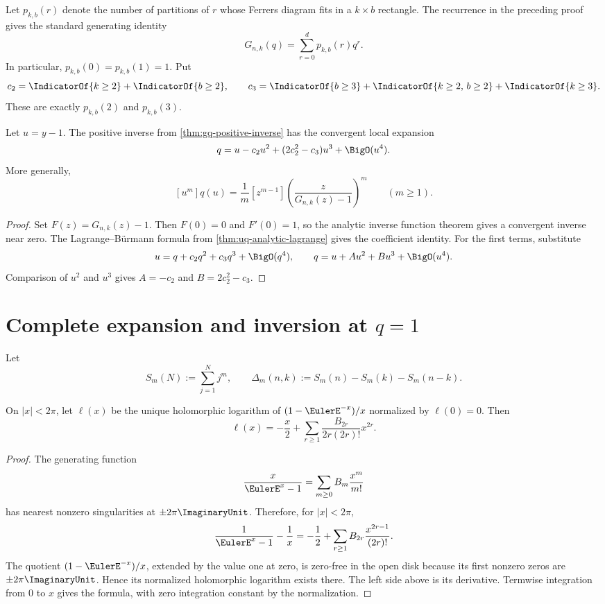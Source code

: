 Let \(p_{k,b}(r)\) denote the number of partitions of \(r\) whose Ferrers
diagram fits in a \(k\times b\) rectangle.  The recurrence in the preceding
proof gives the standard generating identity
\[
  G_{n,k}(q)=\sum_{r=0}^{d}p_{k,b}(r)q^r.
\]
In particular, \(p_{k,b}(0)=p_{k,b}(1)=1\).  Put
\[
  c_2=\IndicatorOf{k\ge2}+\IndicatorOf{b\ge2},
  \qquad
  c_3=\IndicatorOf{b\ge3}
      +\IndicatorOf{k\ge2,\,b\ge2}
      +\IndicatorOf{k\ge3}.
\]
These are exactly \(p_{k,b}(2)\) and \(p_{k,b}(3)\).

\begin{theorem}
\label{thm:gq-zero-inverse}
Let \(u=y-1\).  The positive inverse from
\cref{thm:gq-positive-inverse} has the convergent local expansion
\[
  q=u-c_2u^2+(2c_2^2-c_3)u^3+\BigO(u^4).
\]
More generally,
\[
  [u^m]q(u)
  =\frac1m[z^{m-1}]
    \left(\frac{z}{G_{n,k}(z)-1}\right)^m
  \qquad(m\ge1).
\]
\end{theorem}

\begin{proof}
Set \(F(z)=G_{n,k}(z)-1\).  Then \(F(0)=0\) and \(F'(0)=1\), so the
analytic inverse function theorem gives a convergent inverse near zero.
The Lagrange--Bürmann formula from
\cref{thm:uq-analytic-lagrange} gives the coefficient identity.  For the
first terms, substitute
\[
  u=q+c_2q^2+c_3q^3+\BigO(q^4),
  \qquad
  q=u+A u^2+B u^3+\BigO(u^4).
\]
Comparison of \(u^2\) and \(u^3\) gives \(A=-c_2\) and
\(B=2c_2^2-c_3\).
\end{proof}

\section{\texorpdfstring{Complete expansion and inversion at \(q=1\)}{Complete expansion and inversion at q=1}}
\label{sec:gaussian-one}

Let
\[
  S_m(N):=\sum_{j=1}^{N}j^m,
  \qquad
  \Delta_m(n,k):=S_m(n)-S_m(k)-S_m(n-k).
\]

\begin{lemma}
\label{lem:gq-bernoulli-factor}
On \(|x|<2\pi\), let \(\ell(x)\) be the unique holomorphic logarithm of
\((1-\EulerE^{-x})/x\) normalized by \(\ell(0)=0\).  Then
\[
  \ell(x)
  =-\frac{x}{2}
   +\sum_{r\ge1}\frac{B_{2r}}{2r(2r)!}x^{2r}.
\]
\end{lemma}

\begin{proof}
The generating function
\[
  \frac{x}{\EulerE^x-1}
  =\sum_{m\ge0}B_m\frac{x^m}{m!}
\]
has nearest nonzero singularities at \(\pm2\pi\ImaginaryUnit\).  Therefore, for
\(|x|<2\pi\),
\[
  \frac1{\EulerE^x-1}-\frac1x
  =-\frac12+\sum_{r\ge1}B_{2r}\frac{x^{2r-1}}{(2r)!}.
\]
The quotient \((1-\EulerE^{-x})/x\), extended by the value one at zero, is
zero-free in the open disk because its first nonzero zeros are
\(\pm2\pi\ImaginaryUnit\).  Hence its normalized holomorphic logarithm
exists there.  The left side above is its derivative.  Termwise integration
from \(0\) to \(x\) gives the formula, with zero integration constant by the
normalization.
\end{proof}

